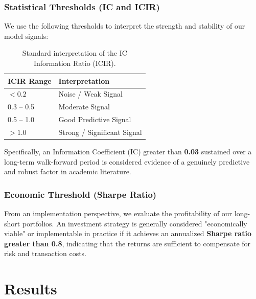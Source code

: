 \documentclass[11pt]{article}
\begin{document}
\subsubsection{Statistical Thresholds (IC and ICIR)}
We use the following thresholds to interpret the strength and stability of our model signals:

\begin{table}[H]
\centering
\begin{tabular}{ll}
\toprule
\textbf{ICIR Range} & \textbf{Interpretation} \\
\midrule
$< 0.2$   & Noise / Weak Signal \\
0.3 -- 0.5 & Moderate Signal \\
0.5 -- 1.0 & Good Predictive Signal \\
$> 1.0$    & Strong / Significant Signal \\
\bottomrule
\end{tabular}
\caption{Standard interpretation of the IC Information Ratio (ICIR).}
\end{table}

Specifically, an Information Coefficient (IC) greater than \textbf{0.03} sustained over a long-term walk-forward period is considered evidence of a genuinely predictive and robust factor in academic literature.

\subsubsection{Economic Threshold (Sharpe Ratio)}
From an implementation perspective, we evaluate the profitability of our long-short portfolios. An investment strategy is generally considered "economically viable" or implementable in practice if it achieves an annualized \textbf{Sharpe ratio greater than 0.8}, indicating that the returns are sufficient to compensate for risk and transaction costs.

\section{Results}

\end{document}
